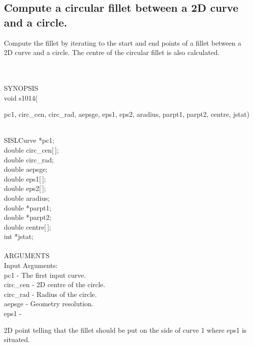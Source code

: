 \subsection{Compute a circular fillet between a 2D curve and a circle.}
\begin{minipg1}
  Compute the fillet by iterating to the start and end points of a
  fillet between a 2D curve and a circle. The centre of the circular
  fillet is also calculated.
\end{minipg1} \\ \\
SYNOPSIS\\
        \>void s1014(\begin{minipg3}
        {\fov pc1}, {\fov circ\_cen}, {\fov circ\_rad}, {\fov aepsge}, {\fov eps1}, {\fov eps2}, {\fov aradius},
        {\fov parpt1}, {\fov parpt2}, {\fov centre}, {\fov jstat})
        \end{minipg3}\\[0.3ex]
        \>\>    SISLCurve \> *{\fov pc1};\\
        \>\>    double    \> {\fov circ\_cen}[\,];\\
        \>\>    double    \> {\fov circ\_rad};\\
        \>\>    double    \> {\fov aepsge};\\
        \>\>    double    \> {\fov eps1}[\,];\\
        \>\>    double    \> {\fov eps2}[\,];\\
        \>\>    double    \> {\fov aradius};\\
        \>\>    double    \> *{\fov parpt1};\\
        \>\>    double    \> *{\fov parpt2};\\
        \>\>    double    \> {\fov centre}[\,];\\
        \>\>    int       \> *{\fov jstat};\\
\\
ARGUMENTS\\
        \>Input Arguments:\\
        \>\>    {\fov pc1}    \> - \> The first input curve.\\
        \>\>    {\fov circ\_cen}   \> - \> 2D centre of the circle.\\
        \>\>    {\fov circ\_rad}   \> - \> Radius of the circle.\\
        \>\>    {\fov aepsge} \> - \> Geometry resolution.\\
        \>\>    {\fov eps1}   \> - \> \begin{minipg2}
                                        2D point telling that the fillet
                                        should be put on the side of
                                        curve 1 where {\fov eps1} is situated.
                                      \end{minipg2}\\[0.8ex]
